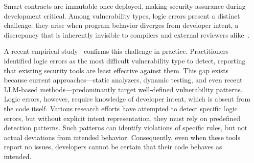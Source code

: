 \documentclass[pdflatex,sn-basic]{sn-jnl}%
\theoremstyle{thmstyleone}%
\theoremstyle{thmstyletwo}%
\theoremstyle{thmstylethree}%
\begin{document}
\begin{table}[!t]
    \centering
    \caption{Distribution of Variable Types in Smart Contract Functions}
    \label{tab:variable_distribution}
\end{table}

Smart contracts are immutable once deployed, making security assurance during development critical.
Among vulnerability types, logic errors present a distinct challenge:
they arise when program behavior diverges from developer intent,
a discrepancy that is inherently invisible to compilers and external reviewers alike~\citep{flyinointment}.

A recent empirical study~\citep{defisecurity} confirms this challenge in practice.
Practitioners identified logic errors as the most difficult vulnerability type to detect,
reporting that existing security tools are least effective against them.
This gap exists because current approaches---static analyzers, dynamic testing, and even recent LLM-based methods---predominantly target well-defined vulnerability patterns.
Logic errors, however, require knowledge of developer intent, which is absent from the code itself.
Various research efforts have attempted to detect specific logic errors,
but without explicit intent representation, they must rely on predefined detection patterns.
Such patterns can identify violations of specific rules, but not actual deviations from intended behavior.
Consequently, even when these tools report no issues, developers cannot be certain that their code behaves as intended.
\end{document}
